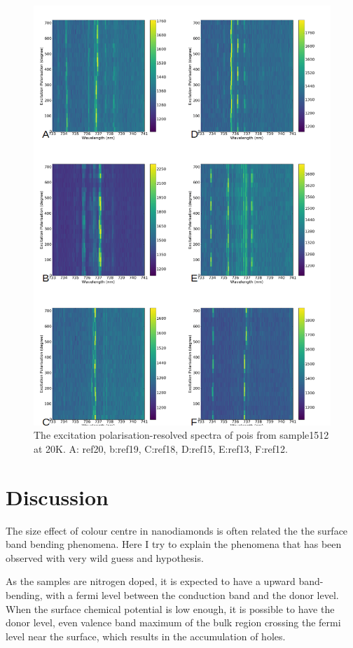 \begin{figure}[h]
\centering
\includegraphics[width=1\linewidth]{Figures/pic/hydrogenterminationpolarisation}
\caption{The excitation polarisation-resolved spectra of pois from sample1512 at 20K. A: ref20, b:ref19, C:ref18, D:ref15, E:ref13, F:ref12.}
\label{fig:hydrogenterminationpolarisation}
\end{figure}

\section{Discussion}

The size effect of colour centre in nanodiamonds is often related the the surface band bending phenomena. Here I try to explain the phenomena that has been observed with very wild guess and hypothesis.

As the samples are nitrogen doped, it is expected to have a upward band-bending, with a fermi level between the conduction band and the donor level. When the surface chemical potential is low enough, it is possible to have the donor level, even valence band maximum of the bulk region crossing the fermi level near the surface, which results in the accumulation of holes. 

